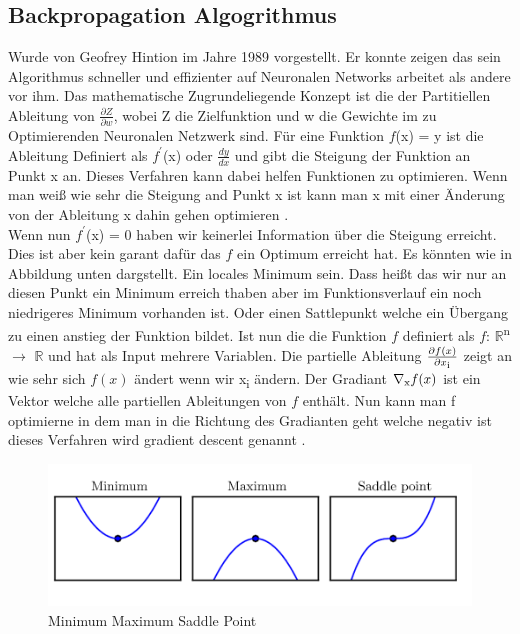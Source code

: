 \documentclass{llncs}
\begin{document}
\subsection{Backpropagation Algogrithmus}
Wurde von Geofrey Hintion im Jahre 1989 vorgestellt\cite{backpro}. Er konnte zeigen das sein Algorithmus schneller und effizienter auf Neuronalen Networks arbeitet als andere vor ihm. Das mathematische Zugrundeliegende Konzept ist die der Partitiellen Ableitung von  $\frac{\partial Z}{\partial w}$, wobei Z die Zielfunktion und w die Gewichte im zu Optimierenden Neuronalen Netzwerk sind. Für eine Funktion $f$(x) = y ist die Ableitung Definiert als $f^\prime$(x) oder $\frac{dy}{dx}$ und gibt die Steigung der Funktion an Punkt x an. Dieses Verfahren kann dabei helfen Funktionen zu optimieren. Wenn man weiß wie sehr die Steigung and Punkt x ist kann man x mit einer Änderung von der Ableitung x dahin gehen optimieren \cite{Grundlagen}. \\
Wenn nun $f^\prime$(x) = 0 haben wir keinerlei Information über die Steigung erreicht. Dies ist aber kein garant dafür das $f$ ein Optimum erreicht hat.  Es könnten wie in Abbildung unten dargstellt. Ein locales Minimum sein. Dass heißt das wir nur an diesen Punkt ein Minimum erreich thaben aber im Funktionsverlauf ein noch niedrigeres Minimum vorhanden ist. Oder einen Sattlepunkt welche ein Übergang zu einen anstieg der Funktion bildet.
Ist nun die die Funktion $f$ definiert als $f$: $\mathbb{R}$\textsuperscript{n} $\rightarrow$  $\mathbb{R}$ und hat als Input mehrere Variablen. Die partielle Ableitung $\frac{\partial f(x)}{\partial x\textsubscript{i}}$ zeigt an wie sehr sich $f(x)$ ändert wenn wir x\textsubscript{i} ändern. Der Gradiant $\nabla\textsubscript{x}f(x)$ ist ein Vektor welche alle partiellen Ableitungen von $f$ enthält. Nun kann man f optimierne in dem man in die Richtung des Gradianten geht welche negativ ist dieses Verfahren wird gradient descent genannt \cite{Grundlagen}.
\begin{figure}[htbp] 
	\centering
	\includegraphics[width=1.0\textwidth]{saddle.png}
	\caption{Minimum Maximum Saddle Point}
	\label{fig:Bild1}
\end{figure}
\end{document}
